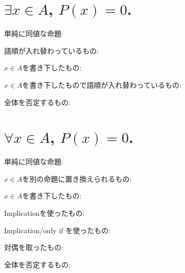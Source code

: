 \documentclass[a4paper,12pt,draft]{amsart}
\newcommand{\PPP}[1]{P(#1)=0}
\begin{document}
\section{$\exists x \in A$, $\PPP{x}$.}
単純に同値な命題:
\begin{itemize}
  
\end{itemize}
語順が入れ替わっているもの:
\begin{itemize}
  
\end{itemize}
$x\in A$を書き下したもの:
\begin{itemize}
  
\end{itemize}
$x\in A$を書き下したもので語順が入れ替わっているもの:
\begin{itemize}
  
\end{itemize}
全体を否定するもの:
\begin{itemize}
  
\end{itemize}



\section{$\forall x \in A$, $\PPP{x}$.}
単純に同値な命題:
\begin{itemize}
  
\end{itemize}
$x\in A$を別の命題に置き換えられるもの:
\begin{itemize}
  
\end{itemize}
$x\in A$を書き下したもの:
\begin{itemize}
  
\end{itemize}
Implicationを使ったもの:
\begin{itemize}
  
\end{itemize}
Implication/only if を使ったもの:
\begin{itemize}
  
\end{itemize}
対偶を取ったもの:
\begin{itemize}
  
\end{itemize}
全体を否定するもの:
\begin{itemize}
  
\end{itemize}
\end{document}
